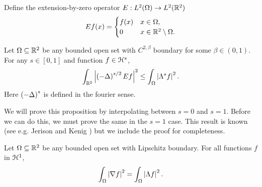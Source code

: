Define the extension-by-zero operator $E:L^2(\Omega) \to L^2(\mathbb{R}^2)$
\[ E f (x) = \begin{cases} f(x) & x \in \Omega, \\ 0 & x \in \mathbb{R}^2 \setminus \Omega. \end{cases} \]

\begin{proposition} \label{thm:hadamard 3 lines}
Let $\Omega \subseteq \mathbb{R}^2$ be any bounded open set with $C^{2,\beta}$ boundary for some $\beta \in (0,1)$.  For any $s \in [0,1]$ and function $f \in \mathcal{H}^s$,
\[ \int_{\mathbb{R}^2} \left\lvert \left( -\Delta \right)^{s/2} E f \right\rvert^2 \leq \int_\Omega \left\lvert \Lambda^s f \right\rvert^2. \]
Here $\left( -\Delta \right)^s$ is defined in the fourier sense.  
\end{proposition}

We will prove this proposition by interpolating between $s = 0$ and $s=1$.  Before we can do this, we must prove the same in the $s=1$ case.  This result is known (see e.g. Jerison and Kenig \cite{JeKe}) but we include the proof for completeness.  

\begin{lemma} \label{thm:H1 and H1}
Let $\Omega \subseteq \mathbb{R}^2$ be any bounded open set with Lipschitz boundary.  For all functions $f$ in $\mathcal{H}^1$,
\[ \int_\Omega \left\lvert \nabla f \right\rvert^2 = \int_\Omega \left\lvert \Lambda f \right\rvert^2. \]
\end{lemma}


